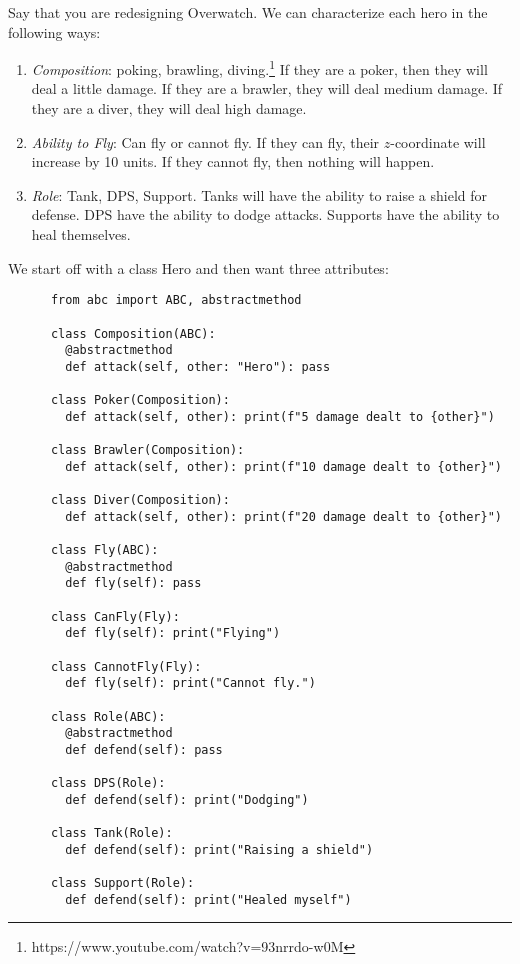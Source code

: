   \begin{example}[Overwatch]
    Say that you are redesigning Overwatch. We can characterize each hero in the following ways: 
    \begin{enumerate}
      \item \textit{Composition}: poking, brawling, diving.\footnote{https://www.youtube.com/watch?v=93nrrdo-w0M} If they are a poker, then they will deal a little damage. If they are a brawler, they will deal medium damage. If they are a diver, they will deal high damage. 
      \item \textit{Ability to Fly}: Can fly or cannot fly. If they can fly, their $z$-coordinate will increase by 10 units. If they cannot fly, then nothing will happen. 
      \item \textit{Role}: Tank, DPS, Support. Tanks will have the ability to raise a shield for defense. DPS have the ability to dodge attacks. Supports have the ability to heal themselves. 
    \end{enumerate}
    We start off with a class Hero and then want three attributes: 

    \begin{lstlisting}
      from abc import ABC, abstractmethod

      class Composition(ABC): 
        @abstractmethod
        def attack(self, other: "Hero"): pass 

      class Poker(Composition): 
        def attack(self, other): print(f"5 damage dealt to {other}")

      class Brawler(Composition): 
        def attack(self, other): print(f"10 damage dealt to {other}")

      class Diver(Composition): 
        def attack(self, other): print(f"20 damage dealt to {other}")

      class Fly(ABC): 
        @abstractmethod 
        def fly(self): pass 

      class CanFly(Fly): 
        def fly(self): print("Flying") 

      class CannotFly(Fly): 
        def fly(self): print("Cannot fly.") 

      class Role(ABC): 
        @abstractmethod 
        def defend(self): pass 

      class DPS(Role): 
        def defend(self): print("Dodging") 

      class Tank(Role): 
        def defend(self): print("Raising a shield")

      class Support(Role): 
        def defend(self): print("Healed myself")
    \end{lstlisting} 


\end{example}
